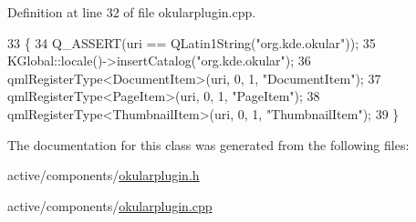 Definition at line 32 of file okularplugin.\+cpp.


\begin{DoxyCode}
33 \{
34     Q\_ASSERT(uri == QLatin1String(\textcolor{stringliteral}{"org.kde.okular"}));
35     KGlobal::locale()->insertCatalog(\textcolor{stringliteral}{"org.kde.okular"});
36     qmlRegisterType<DocumentItem>(uri, 0, 1, \textcolor{stringliteral}{"DocumentItem"});
37     qmlRegisterType<PageItem>(uri, 0, 1, \textcolor{stringliteral}{"PageItem"});
38     qmlRegisterType<ThumbnailItem>(uri, 0, 1, \textcolor{stringliteral}{"ThumbnailItem"});
39 \}
\end{DoxyCode}


The documentation for this class was generated from the following files\+:\begin{DoxyCompactItemize}
\item 
active/components/\hyperlink{okularplugin_8h}{okularplugin.\+h}\item 
active/components/\hyperlink{okularplugin_8cpp}{okularplugin.\+cpp}\end{DoxyCompactItemize}
